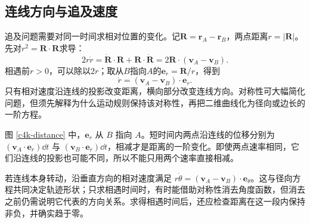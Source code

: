 \subsection{连线方向与追及速度}
追及问题需要对同一时间求相对位置的变化。记$\bm R=\bm r_A-\bm r_B$，两点距离$r=|\bm R|$。先对$r^2=\bm R\cdot\bm R$求导：
\[
2r\dot r=\dot{\bm R}\cdot\bm R+\bm R\cdot\dot{\bm R}
=2\bm R\cdot(\bm v_A-\bm v_B).
\]
相遇前$r>0$，可以除以$2r$；取从$B$指向$A$的$\bm e_r=\bm R/r$，得到
\[
\dot r=(\bm v_A-\bm v_B)\cdot\bm e_r.
\]
只有相对速度沿连线的投影改变距离，横向部分改变连线方向。对称性可大幅简化问题，但须先解释为什么运动规则保持该对称性，再把二维曲线化为径向或边长的一阶方程。

图 \ref{c4k-distance} 中，$\bm e_r$ 从 $B$ 指向 $A$。短时间内两点沿连线的位移分别为 $(\bm v_A\cdot\bm e_r)\dd t$ 与 $(\bm v_B\cdot\bm e_r)\dd t$，相减才是距离的一阶变化。即使两点速率相同，它们沿连线的投影也可能不同，所以不能只用两个速率直接相减。

若连线本身转动，沿垂直方向的相对速度满足 $r\dot\theta=(\bm v_A-\bm v_B)\cdot\bm e_\theta$。这与径向方程共同决定轨迹形状；只求相遇时间时，有时能借助对称性消去角度函数，但消去之前仍需说明它代表的方向关系。求得相遇时间后，还应检查距离在这一段内保持非负，并确实趋于零。

